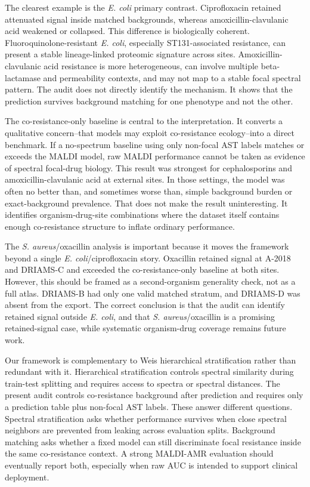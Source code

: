 \documentclass[11pt]{article}
\begin{document}
The clearest example is the \textit{E. coli} primary contrast. Ciprofloxacin retained attenuated signal inside matched backgrounds, whereas amoxicillin-clavulanic acid weakened or collapsed. This difference is biologically coherent. Fluoroquinolone-resistant \textit{E. coli}, especially ST131-associated resistance, can present a stable lineage-linked proteomic signature across sites\cite{nicolas2014st131,price2013st131,benzakour2016st131,nakamura2019st131}. Amoxicillin-clavulanic acid resistance is more heterogeneous, can involve multiple beta-lactamase and permeability contexts, and may not map to a stable focal spectral pattern\cite{canton2011coresistance,pal2015cooccurrence}. The audit does not directly identify the mechanism. It shows that the prediction survives background matching for one phenotype and not the other.

The co-resistance-only baseline is central to the interpretation. It converts a qualitative concern--that models may exploit co-resistance ecology--into a direct benchmark. If a no-spectrum baseline using only non-focal AST labels matches or exceeds the MALDI model, raw MALDI performance cannot be taken as evidence of spectral focal-drug biology. This result was strongest for cephalosporins and amoxicillin-clavulanic acid at external sites. In those settings, the model was often no better than, and sometimes worse than, simple background burden or exact-background prevalence. That does not make the result uninteresting. It identifies organism-drug-site combinations where the dataset itself contains enough co-resistance structure to inflate ordinary performance.

The \textit{S. aureus}/oxacillin analysis is important because it moves the framework beyond a single \textit{E. coli}/ciprofloxacin story. Oxacillin retained signal at A-2018 and DRIAMS-C and exceeded the co-resistance-only baseline at both sites. However, this should be framed as a second-organism generality check, not as a full atlas. DRIAMS-B had only one valid matched stratum, and DRIAMS-D was absent from the export. The correct conclusion is that the audit can identify retained signal outside \textit{E. coli}, and that \textit{S. aureus}/oxacillin is a promising retained-signal case, while systematic organism-drug coverage remains future work.

Our framework is complementary to Weis hierarchical stratification rather than redundant with it\cite{weis2022stratification}. Hierarchical stratification controls spectral similarity during train-test splitting and requires access to spectra or spectral distances. The present audit controls co-resistance background after prediction and requires only a prediction table plus non-focal AST labels. These answer different questions. Spectral stratification asks whether performance survives when close spectral neighbors are prevented from leaking across evaluation splits. Background matching asks whether a fixed model can still discriminate focal resistance inside the same co-resistance context. A strong MALDI-AMR evaluation should eventually report both, especially when raw AUC is intended to support clinical deployment.
\end{document}
